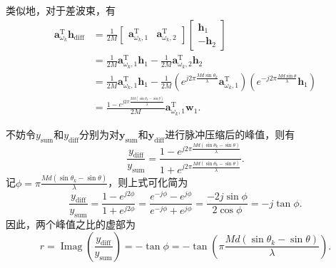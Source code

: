类似地，对于差波束，有
\[
    \begin{split}
        \bm{a}_{\omega_k}^{\mathrm{T}} \bm{h}_{\text{diff}} & = \frac{1}{2M}\begin{bmatrix}
                                                                                \bm{a}_{\omega_k,1}^{\mathrm{T}} & \bm{a}_{\omega_k,2}^{\mathrm{T}}
                                                                            \end{bmatrix}
        \begin{bmatrix}
            \bm{h}_1 \\
            -\bm{h}_2
        \end{bmatrix}                                                                                                                                                                                                                                                                                   \\
                                                            & = \frac{1}{2M} \bm{a}_{\omega_k,1}^{\mathrm{T}} \bm{h}_1 - \frac{1}{2M} \bm{a}_{\omega_k,2}^{\mathrm{T}} \bm{h}_2                                                                                                                          \\
                                                            & = \frac{1}{2M} \bm{a}_{\omega_k,1}^{\mathrm{T}} \bm{h}_1 - \frac{1}{2M} \left( e^{j 2 \pi \frac{M d \sin \theta_k}{\lambda}} \bm{a}_{\omega_k,1}^{\mathrm{T}} \right) \left( e^{-j 2 \pi \frac{M d \sin \theta}{\lambda}} \bm{h}_1 \right) \\
                                                            & = \frac{1 - e^{j 2\pi \frac{M d (\sin \theta_k - \sin \theta)}{\lambda}}}{2M} \bm{a}_{\omega_k,1}^{\mathrm{T}} \bm{w}_1.
    \end{split}
\]

不妨令\( y_{\text{sum}} \)和\( y_{\text{diff}} \)分别为对\( \bm{y}_{\text{sum}} \)和\( \bm{y}_{\text{diff}} \)进行脉冲压缩后的峰值，则有
\[
    \frac{y_{\text{diff}}}{y_{\text{sum}}} = \frac{1 - e^{j 2\pi \frac{M d (\sin \theta_k - \sin \theta)}{\lambda}}}{1 + e^{j 2\pi \frac{M d (\sin \theta_k - \sin \theta)}{\lambda}}}.
\]
记\( \phi = \pi \frac{M d (\sin \theta_k - \sin \theta)}{\lambda} \)，则上式可化简为
\[
    \frac{y_{\text{diff}}}{y_{\text{sum}}} = \frac{1 - e^{j 2 \phi}}{1 + e^{j 2 \phi}} = \frac{e^{-j \phi} - e^{j \phi}}{e^{-j \phi} + e^{j \phi}} = \frac{-2j \sin \phi}{2 \cos \phi} =-j \tan \phi.
\]
因此，两个峰值之比的虚部为
\[
    r = \operatorname{Imag}\left( \frac{y_{\text{diff}}}{y_{\text{sum}}} \right) = - \tan \phi = - \tan \left( \pi \frac{M d (\sin \theta_k - \sin \theta)}{\lambda} \right).
\]


